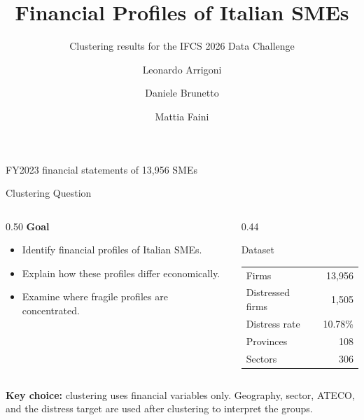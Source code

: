 \documentclass[aspectratio=169,10pt]{beamer}
\title[IFCS SME Profiles]{Financial Profiles of Italian SMEs}
\subtitle{Clustering results for the IFCS 2026 Data Challenge}
\author{Leonardo Arrigoni \and Daniele Brunetto \and Mattia Faini}
\date{}
\newcommand{\pct}[1]{#1\%}
\begin{document}
\begin{frame}
  \titlepage
  \vspace{-0.6cm}
  \begin{center}
    \small FY2023 financial statements of 13,956 SMEs
  \end{center}
\end{frame}

\begin{frame}{Clustering Question}
  \begin{columns}[T,totalwidth=\textwidth]
    \begin{column}{0.50\textwidth}
      \textbf{Goal}
      \begin{itemize}
        \item Identify financial profiles of Italian SMEs.
        \item Explain how these profiles differ economically.
        \item Examine where fragile profiles are concentrated.
      \end{itemize}
    \end{column}
    \begin{column}{0.44\textwidth}
      \begin{block}{Dataset}
        \centering
        \begin{tabular}{lr}
          \toprule
          Firms & 13,956 \\
          Distressed firms & 1,505 \\
          Distress rate & \pct{10.78} \\
          Provinces & 108 \\
          Sectors & 306 \\
          \bottomrule
        \end{tabular}
      \end{block}
    \end{column}
  \end{columns}

  \vspace{0.25cm}
  \textbf{Key choice:} clustering uses financial variables only. Geography,
  sector, ATECO, and the distress target are used after clustering to interpret
  the groups.
\end{frame}
\end{document}
